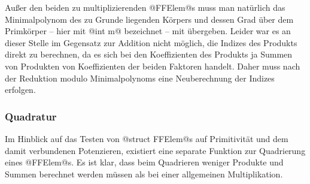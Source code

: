 Außer den beiden zu multiplizierenden @FFElem@s muss man natürlich das
Minimalpolynom des zu Grunde liegenden Körpers und dessen Grad über dem
Primkörper -- hier mit @int m@ bezeichnet -- mit übergeben.
Leider war es an dieser Stelle im Gegensatz zur Addition nicht 
möglich, die Indizes des Produkts direkt zu berechnen, da es sich bei den
Koeffizienten des Produkts ja Summen von Produkten von Koeffizienten der beiden
Faktoren handelt. Daher muss nach der
Reduktion modulo Minimalpolynoms eine Neuberechnung der Indizes erfolgen.

\subsubsection{Quadratur}
Im Hinblick auf das Testen von @struct FFElem@s auf Primitivität und dem damit
verbundenen Potenzieren, existiert eine separate Funktion zur Quadrierung eines 
@FFElem@s. Es ist klar, dass beim Quadrieren weniger Produkte und Summen
berechnet werden müssen als bei einer allgemeinen Multiplikation.
